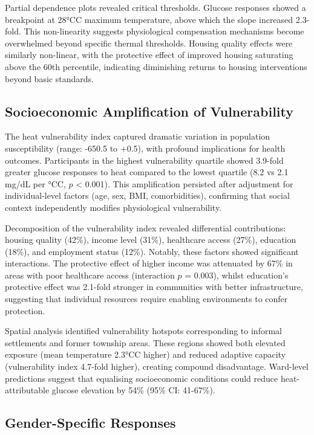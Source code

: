 \documentclass[11pt,a4paper]{article}
\newcommand{\degrees}{°C}
\begin{document}
Partial dependence plots revealed critical thresholds. Glucose responses showed a breakpoint at 28\degrees C maximum temperature, above which the slope increased 2.3-fold. This non-linearity suggests physiological compensation mechanisms become overwhelmed beyond specific thermal thresholds. Housing quality effects were similarly non-linear, with the protective effect of improved housing saturating above the 60th percentile, indicating diminishing returns to housing interventions beyond basic standards.

\subsection{Socioeconomic Amplification of Vulnerability}

The heat vulnerability index captured dramatic variation in population susceptibility (range: -650.5 to +0.5), with profound implications for health outcomes. Participants in the highest vulnerability quartile showed 3.9-fold greater glucose responses to heat compared to the lowest quartile (8.2 vs 2.1 mg/dL per \degrees C, $p$ < 0.001). This amplification persisted after adjustment for individual-level factors (age, sex, BMI, comorbidities), confirming that social context independently modifies physiological vulnerability.

Decomposition of the vulnerability index revealed differential contributions: housing quality (42\%), income level (31\%), healthcare access (27\%), education (18\%), and employment status (12\%). Notably, these factors showed significant interactions. The protective effect of higher income was attenuated by 67\% in areas with poor healthcare access (interaction $p$ = 0.003), whilst education's protective effect was 2.1-fold stronger in communities with better infrastructure, suggesting that individual resources require enabling environments to confer protection.

Spatial analysis identified vulnerability hotspots corresponding to informal settlements and former township areas. These regions showed both elevated exposure (mean temperature 2.3\degrees C higher) and reduced adaptive capacity (vulnerability index 4.7-fold higher), creating compound disadvantage. Ward-level predictions suggest that equalising socioeconomic conditions could reduce heat-attributable glucose elevation by 54\% (95\% CI: 41-67\%).

\subsection{Gender-Specific Responses}
\end{document}
